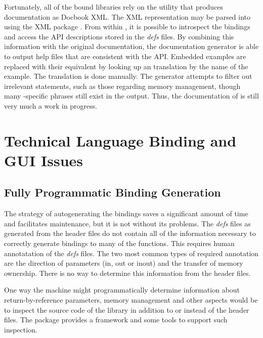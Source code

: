 \documentclass[article]{jss}
\begin{document}
Fortunately, all of the bound libraries rely on the 
utility that 
produces documentation as Docbook XML. The XML representation may be
parsed into  using the XML package \citep{XML}. From
within , it is possible
to introspect the bindings and access the API descriptions stored
in the \emph{defs} files. By combining this information with the
original 
documentation, the documentation generator is able to output
 help
files that are consistent with the  API. Embedded
examples are replaced with their  equivalent by looking up
an  translation by the name of the example. The
translation is
done manually. The generator attempts to filter out irrelevant
statements, 
such as those  regarding memory management, though many
-specific 
phrases still exist in the output. Thus, the documentation of
is still very much a work in progress.

\section{Technical Language Binding and GUI Issues}

\subsection{Fully Programmatic Binding Generation}

The strategy of autogenerating the bindings saves a significant amount
of time and facilitates maintenance, but it is not without its
problems.
The \emph{defs} files as generated from the header files do not
contain all
of the information necessary to correctly generate bindings to many
of the  functions. This requires human annotatation of the
\emph{defs}
files.  The two most common types of required annotation are the
direction
of parameters (in, out or inout) and the transfer of memory ownership. There
is no
way to determine this information from the header files. 

One way the machine might programmatically determine information about
return-by-reference parameters, memory management and other aspects
would be to inspect the  source code of the library in
addition to
or instead of the header files. The  package
\citep*{RGCCTU}
provides a framework and some tools to support such inspection.
\end{document}
